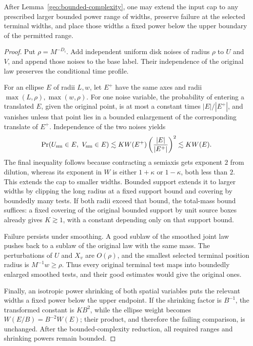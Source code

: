\begin{lemma}\label{geo:range-extension}
After Lemma~\ref{geo:bounded-complexity}, one may extend the
input cap to any prescribed larger bounded power range of
widths, preserve failure at the selected terminal widths, and
place those widths a fixed power below the upper boundary of
the permitted range.
\end{lemma}

\begin{proof}
Put \(\rho=M^{-D_i}\).  Add independent uniform disk noises of
radius \(\rho\) to \(U\) and \(V\), and append those noises to
the base label.  Their independence of the original law
preserves the conditional time profile.

For an ellipse \(E\) of radii \(L,w\), let \(E^+\) have the
same axes and radii \(\max(L,\rho),\max(w,\rho)\).
For one noise variable, the probability of entering a
translated \(E\), given the original point, is at most a
constant times \(|E|/|E^+|\), and vanishes unless that point
lies in a bounded enlargement of the corresponding
translate of \(E^+\).  Independence of the two noises yields
\[
\Pr(U_{\rm sm}\in E,\ V_{\rm sm}\in E)
\lesssim
KW(E^+)\left(\frac{|E|}{|E^+|}\right)^2
\lesssim KW(E).
\]
The final inequality follows because contracting a semiaxis
gets exponent \(2\) from dilution, whereas its exponent in
\(W\) is either \(1+\kappa\) or \(1-\kappa\), both less than
\(2\).  This extends the cap to smaller widths.  Bounded
support extends it to larger widths by clipping the long
radius at a fixed support bound and covering by boundedly
many tests.  If both radii exceed that bound, the total-mass
bound suffices: a fixed covering of the original bounded
support by unit source boxes already gives \(K\gtrsim1\),
with a constant depending only on that support bound.

Failure persists under smoothing.  A good sublaw of the
smoothed joint law pushes back to a sublaw of the original
law with the same mass.  The perturbations of \(U\) and
\(X_v\) are \(O(\rho)\), and the smallest selected terminal
position radius is \(M^{-1}w\ge\rho\).  Thus every original
terminal test maps into boundedly enlarged smoothed tests,
and their good estimates would give the original ones.

Finally, an isotropic power shrinking of both spatial
variables puts the relevant widths a fixed power below the
upper endpoint.  If the shrinking factor is \(B^{-1}\),
the transformed constant is \(KB^2\), while the ellipse
weight becomes \(W(E/B)=B^{-2}W(E)\); their product, and
therefore the failing comparison, is unchanged.  After the
bounded-complexity reduction, all required ranges and
shrinking powers remain bounded.
\end{proof}

